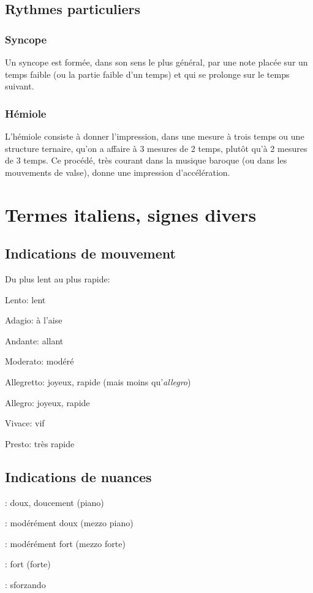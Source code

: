 \documentclass[11pt]{scrreprt}
\begin{document}
\section{Rythmes particuliers}
\subsection{Syncope}
Un syncope est formée, dans son sens le plus général, par une note placée sur un temps faible (ou la partie faible d'un temps) et qui se prolonge sur le temps suivant. 
\subsection{Hémiole}
L'hémiole consiste à donner l'impression, dans une mesure à trois temps ou une structure ternaire, qu'on a affaire à 3 mesures de 2 temps, plutôt qu'à 2 mesures de 3 temps. Ce procédé, très courant dans la musique baroque (ou dans les mouvements de valse), donne une impression d'accélération.

\chapter{Termes italiens, signes divers}
\section{Indications de mouvement}
Du plus lent au plus rapide:


\begin{description}
\item Lento: lent
\item Adagio: à l'aise
\item Andante: allant
\item Moderato: modéré
\item Allegretto: joyeux, rapide (mais moins qu'\emph{allegro})
\item Allegro: joyeux, rapide
\item Vivace: vif
\item Presto: très rapide
\end{description}

\section{Indications de nuances}
\begin{description}
\item {} : doux, doucement (piano)
\item {} : modérément doux (mezzo piano)
\item {} : modérément fort (mezzo forte)
\item {} : fort (forte)
\item {} : sforzando
\end{description}
\end{document}
